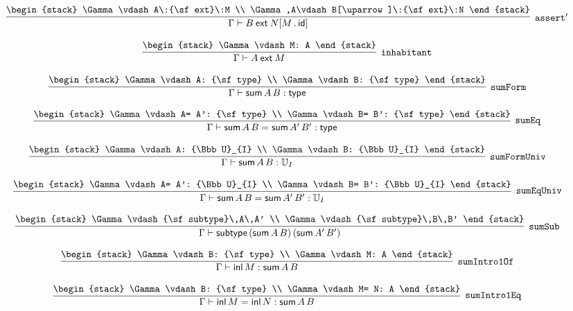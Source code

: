 \[
\infer[{\tt assert'}]{\Gamma \vdash B\:{\sf ext}\:N[M\,.\,{\sf id}]}{
\begin{stack}
\Gamma \vdash A\:{\sf ext}\:M
\\
\Gamma ,A\vdash B[\uparrow ]\:{\sf ext}\:N
\end{stack}}
\]

\[
\infer[{\tt inhabitant}]{\Gamma \vdash A\:{\sf ext}\:M}{
\begin{stack}
\Gamma \vdash M: A
\end{stack}}
\]

\[
\infer[{\tt sumForm}]{\Gamma \vdash {\sf sum}\,A\,B: {\sf type}}{
\begin{stack}
\Gamma \vdash A: {\sf type}
\\
\Gamma \vdash B: {\sf type}
\end{stack}}
\]

\[
\infer[{\tt sumEq}]{\Gamma \vdash {\sf sum}\,A\,B= {\sf sum}\,A'\,B': {\sf type}}{
\begin{stack}
\Gamma \vdash A= A': {\sf type}
\\
\Gamma \vdash B= B': {\sf type}
\end{stack}}
\]

\[
\infer[{\tt sumFormUniv}]{\Gamma \vdash {\sf sum}\,A\,B: {\Bbb U}_{I}}{
\begin{stack}
\Gamma \vdash A: {\Bbb U}_{I}
\\
\Gamma \vdash B: {\Bbb U}_{I}
\end{stack}}
\]

\[
\infer[{\tt sumEqUniv}]{\Gamma \vdash {\sf sum}\,A\,B= {\sf sum}\,A'\,B': {\Bbb U}_{I}}{
\begin{stack}
\Gamma \vdash A= A': {\Bbb U}_{I}
\\
\Gamma \vdash B= B': {\Bbb U}_{I}
\end{stack}}
\]

\[
\infer[{\tt sumSub}]{\Gamma \vdash {\sf subtype}\,({\sf sum}\,A\,B)\,({\sf sum}\,A'\,B')}{
\begin{stack}
\Gamma \vdash {\sf subtype}\,A\,A'
\\
\Gamma \vdash {\sf subtype}\,B\,B'
\end{stack}}
\]

\[
\infer[{\tt sumIntro1Of}]{\Gamma \vdash {\sf inl}\,M: {\sf sum}\,A\,B}{
\begin{stack}
\Gamma \vdash B: {\sf type}
\\
\Gamma \vdash M: A
\end{stack}}
\]

\[
\infer[{\tt sumIntro1Eq}]{\Gamma \vdash {\sf inl}\,M= {\sf inl}\,N: {\sf sum}\,A\,B}{
\begin{stack}
\Gamma \vdash B: {\sf type}
\\
\Gamma \vdash M= N: A
\end{stack}}
\]


